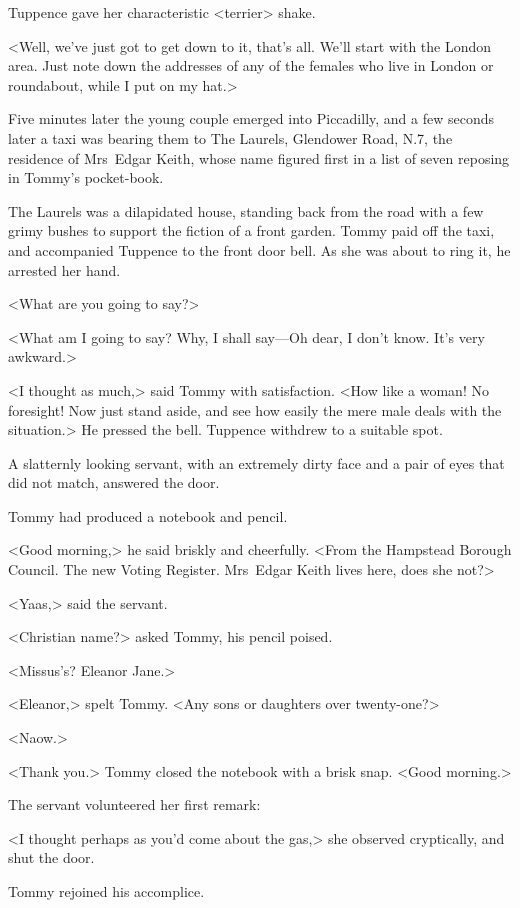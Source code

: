 Tuppence gave her characteristic <terrier> shake.

<Well, we've just got to get down to it, that's all. We'll start with the London area. Just note down the addresses of any of the females who live in London or roundabout, while I put on my hat.>

Five minutes later the young couple emerged into Piccadilly, and a few seconds later a taxi was bearing them to The Laurels, Glendower Road, N.7, the residence of Mrs~Edgar Keith, whose name figured first in a list of seven reposing in Tommy's pocket-book.

The Laurels was a dilapidated house, standing back from the road with a few grimy bushes to support the fiction of a front garden. Tommy paid off the taxi, and accompanied Tuppence to the front door bell. As she was about to ring it, he arrested her hand.

<What are you going to say?>

<What am I going to say? Why, I shall say—Oh dear, I don't know. It's very awkward.>

<I thought as much,> said Tommy with satisfaction. <How like a woman! No foresight! Now just stand aside, and see how easily the mere male deals with the situation.> He pressed the bell. Tuppence withdrew to a suitable spot.

A slatternly looking servant, with an extremely dirty face and a pair of eyes that did not match, answered the door.

Tommy had produced a notebook and pencil.

<Good morning,> he said briskly and cheerfully. <From the Hampstead Borough Council. The new Voting Register. Mrs~Edgar Keith lives here, does she not?>

<Yaas,> said the servant.

<Christian name?> asked Tommy, his pencil poised.

<Missus's? Eleanor Jane.>

<Eleanor,> spelt Tommy. <Any sons or daughters over twenty-one?>

<Naow.>

<Thank you.> Tommy closed the notebook with a brisk snap. <Good morning.>

The servant volunteered her first remark:

<I thought perhaps as you'd come about the gas,> she observed cryptically, and shut the door.

Tommy rejoined his accomplice.

